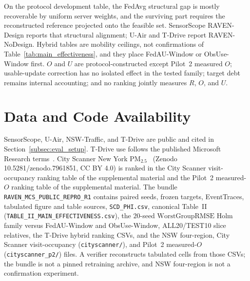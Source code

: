 \documentclass[letterpaper,journal]{IEEEtran}
\begin{document}
On the protocol development table, the FedAvg structural gap is mostly
recoverable by uniform server weights, and the surviving part requires the
reconstructed reference projected onto the feasible set.  SensorScope
RAVEN-Design reports that structural alignment; U-Air and T-Drive report
RAVEN-NoDesign.  Hybrid tables are mobility ceilings, not confirmations of
Table~\ref{tab:main_effectiveness}, and they place FedAU-Window or ObsUse-Window
first.  $O$ and $U$ are protocol-constructed except Pilot~2 measured $O$;
usable-update correction has no isolated effect in the tested family; target debt
remains internal accounting; and no ranking jointly measures $R$, $O$, and $U$.

\section*{Data and Code Availability}
SensorScope, U-Air, NSW-Traffic, and T-Drive are public and cited in
Section~\ref{subsec:eval_setup}.  T-Drive use follows the published
Microsoft Research terms~\cite{yuan2010tdrive}.
City Scanner New York {PM}$_{2.5}$~\cite{wang2023cityscanner}
(Zenodo 10.5281/zenodo.7961851, CC BY 4.0) is ranked in
the City Scanner visit-occupancy ranking table of the supplemental material and
the Pilot~2 measured-$O$ ranking table of the supplemental material.
The bundle \texttt{RAVEN\_MCS\_PUBLIC\_REPRO\_R1} contains paired seeds,
frozen targets, EventTraces, tabulated figure and table sources,
\texttt{SCD\_PHI.csv}, canonical Table~II
(\texttt{TABLE\_II\_MAIN\_EFFECTIVENESS.csv}),
the $20$-seed $\mathrm{WorstGroupRMSE}$ Holm family versus FedAU-Window and
ObsUse-Window, ALL20/TEST10 slice relatives, the T-Drive hybrid ranking CSVs,
and the NSW four-region, City Scanner visit-occupancy
(\texttt{cityscanner/}), and Pilot~2 measured-$O$ (\texttt{cityscanner\_p2/})
files.  A verifier reconstructs tabulated cells from those CSVs; the bundle is
not a pinned retraining archive, and NSW four-region is not a confirmation
experiment.
\end{document}
